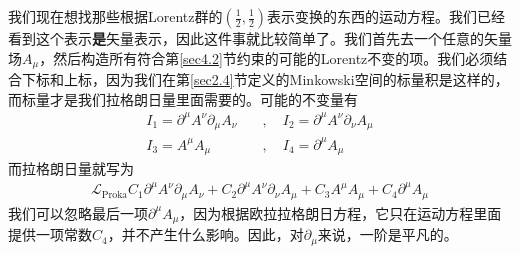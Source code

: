 我们现在想找那些根据Lorentz群的$(\frac{1}{2},\frac{1}{2})$表示变换的东西的运动方程。我们已经看到这个表示{\bf 是}矢量表示，因此这件事就比较简单了。我们首先去一个任意的矢量场$A_\mu$，然后构造所有符合第\ref{sec4.2}节约束的可能的Lorentz不变的项。我们必须结合下标和上标，因为我们在第\ref{sec2.4}节定义的Minkowski空间的标量积是这样的，而标量才是我们拉格朗日量里面需要的。可能的不变量有
\[\begin{split}
I_1=\partial^\mu A^\nu\partial_\mu A_\nu\quad &,\quad I_2=\partial^\mu A^\nu\partial_\nu A_\mu\\
I_3=A^\mu A_\mu\quad &,\quad I_4=\partial^\mu A_\mu
\end{split}\]
而拉格朗日量就写为
\begin{align}\label{eq6.19}
\mathscr{L}_{\text{Proka}}C_1\partial^\mu A^\nu\partial_\mu A_\nu+C_2\partial^\mu A^\nu\partial_\nu A_\mu+C_3A^\mu A_\mu+C_4\partial^\mu A_\mu
\end{align}
我们可以忽略最后一项$\partial^\mu A_\mu$，因为根据欧拉拉格朗日方程，它只在运动方程里面提供一项常数$C_4$，并不产生什么影响。因此，对$\partial_\mu$来说，一阶是平凡的。


